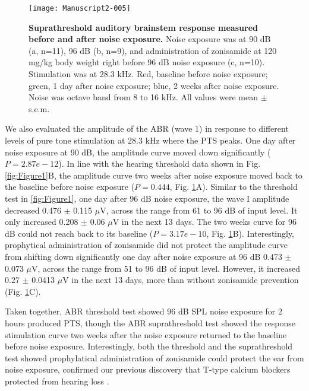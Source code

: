 \documentclass[11pt]{article}
\begin{document}
\begin{figure}[ht]
\centering
\texttt{[image: Manuscript2-005]}

\caption{{\bf {Suprathreshold auditory brainstem response measured before and after noise exposure.}}  Noise exposure was at 90 dB (a, n=11), 96 dB (b, n=9), and administration of zonisamide at 120 mg/kg body weight right before 96 dB noise exposure (c, n=10). Stimulation was at 28.3 kHz.  Red, baseline before noise exposure; green, 1 day after noise exposure; blue, 2 weeks after noise exposure.  Noise was octave band from 8 to 16 kHz. All values were mean $\pm$ s.e.m.}
\label{fig:Figure2}
\end{figure}

We also evaluated the amplitude of the ABR (wave 1) in response to different levels of pure tone stimulation at 28.3 kHz where the PTS peaks. One day after noise exposure at 90 dB, the amplitude curve moved down significantly ($P=2.87e-12$). In line with the hearing threshold data shown in Fig. \ref{fig:Figure1}B, the amplitude curve two weeks after noise exposure moved back to the baseline before noise exposure 
($P=0.444$, Fig. \ref{fig:Figure2}A). Similar to the threshold test in \ref{fig:Figure1}, one day after 96 dB noise exposure, the wave I amplitude decreased 0.476 
$\pm$ 
0.115 $\mu$V, across the range from 61 to 96 dB of input level. It only increased 0.208 
$\pm$ 
0.06 $\mu$V in the next 13 days. The two weeks curve for 96 dB could not reach back to its baseline 
($P=3.17e-10$, Fig. \ref{fig:Figure2}B). Interestingly, prophytical administration of zonisamide did not protect the amplitude curve from shifting down significantly one day after noise exposure at 96 dB 0.473 
$\pm$ 
0.073 $\mu$V, across the range from 51 to 96 dB of input level. However, it increased 0.27 
$\pm$ 
0.0413 $\mu$V in the next 13 days, more than without zonisamide prevention (Fig. \ref{fig:Figure2}C).

Taken together, ABR threshold test showed 96 dB SPL noise exposure for 2 hours produced PTS, though the ABR suprathreshold test showed the response stimulation curve two weeks after the noise exposure returned to the baseline before noise exposure. Interestingly, both the threshold and the suprathreshold test showed prophylatical administration of zonisamide could protect the ear from noise exposure, confirmed our previous discovery that T-type calcium blockers protected from hearing loss \cite{Shen2007,Lei2011}.
\end{document}
